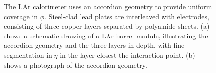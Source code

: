 \begin{figure}[htbp]
	\centering
	\caption{The LAr calorimeter uses an accordion geometry to provide uniform coverage in $\phi$. Steel-clad lead plates are interleaved with electrodes, consisting of three copper layers separated by polyamide sheets. (a) shows a schematic drawing of a LAr barrel module, illustrating the accordion geometry and the three layers in depth, with fine segmentation in $\eta$ in the layer closest the interaction point. (b) shows a photograph of the accordion geometry.}
	\label{fig:ATLAS-LAr-module}
\end{figure}

